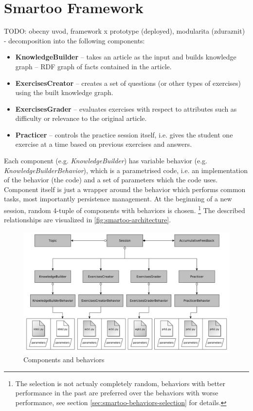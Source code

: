 \documentclass[a4paper, 12pt, twoside]{fithesis2}		%
\renewcommand{\_}{\leavevmode \kern0.07em\vbox{\hrule width0.4em}}
\newcommand{\squarebullet}{\textcolor{black}{\raisebox{0.15em}{\rule{4pt}{4pt}}}}
\newcommand{\emptysquarebullet}{\textcolor{black}{\raisebox{0.10em}{\tiny$\square$}}}
\newenvironment{myItemize}{
  \begin{itemize}[leftmargin=2em,rightmargin=1em,itemsep=\parskip ,parsep=0em,topsep=0em,partopsep=0em]
  \renewcommand{\labelitemi}{\squarebullet}
  \renewcommand{\labelitemii}{\textbullet}
}{
  \end{itemize}
}
\begin{document}
\chapter{Smartoo Framework}
\label{chap:smartoo}

TODO: obecny uvod, framework x prototype (deployed), modularita (zduraznit) - decomposition into the following components:
\begin{myItemize}
\item \textbf{KnowledgeBuilder} -- takes an article as the input and builds knowledge graph -- RDF graph of facts contained in the article.
\item \textbf{ExercisesCreator} -- creates a set of questions (or other types of exercises) using the built knowledge graph.
\item \textbf{ExercisesGrader} -- evaluates exercises with respect to attributes such as difficulty or relevance to the original article.
\item \textbf{Practicer} -- controls the practice session itself, i.e. gives the student one exercise at a time based on previous exercises and answers.
\end{myItemize}
Each component (e.g. \textit{KnowledgeBuilder}) has variable behavior (e.g. \textit{KnowledgeBuilderBehavior}), which is a parametrised code, i.e. an implementation of the behavior (the code) and a set of parameters which the code uses.
Component itself is just a wrapper around the behavior which performs common tasks, most importantly persistence management.
At the beginning of a new session, random 4-tuple of components with behaviors is chosen.%
\footnote{The selection is not actualy completely random, behaviors with better performance in the past are preferred over the behaviors with worse performance, see section \autoref{sec:smartoo-behaviors-selection} for details.} The described relationships are visualized in \autoref{fig:smartoo-architecture}.


\begin{figure}[h]
  \centering
  \includegraphics[width=\textwidth]{images/architecture.pdf}
  \caption{Components and behaviors}
  \label{fig:smartoo-architecture}
\end{figure}
\end{document}
